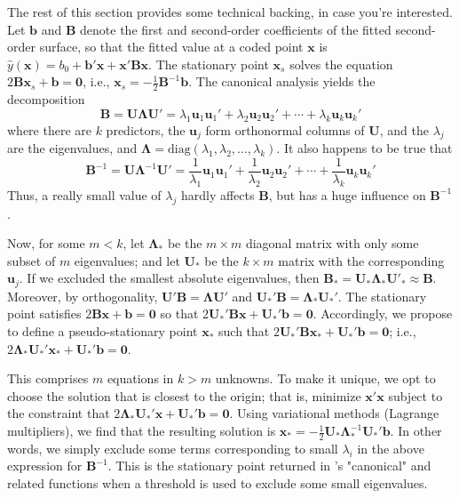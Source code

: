 \documentclass[article,nojss]{jss}
\def\rsm{\pkg{rsm}}
\def\bb{\mathbf{b}}
\def\bB{\mathbf{B}}
\def\bu{\mathbf{u}}
\def\bU{\mathbf{U}}
\def\bLambda{\pmb{\Lambda}}
\def\bgamma{\pmb{\gamma}}
\def\bx{\mathbf{x}}
\def\bzero{\mathbf{0}}
\def\yhat{\hat{y}}
\def\bmat#1{\begin{bmatrix}#1\end{bmatrix}}
\begin{document}
The rest of this section provides some technical backing, in case you're interested. Let $\bb$ and $\bB$ denote the first and second-order coefficients of the fitted second-order surface, so that the fitted value at a coded point $\bx$ is $\yhat(\bx) = b_0 + \bb'\bx + \bx'\bB\bx$. The stationary point $\bx_s$ solves the equation $2\bB\bx_s + \bb = \bzero$, i.e., $\bx_s = -\frac12\bB^{-1}\bb$. The canonical analysis yields the decomposition 
\[ \bB = \bU\bLambda\bU' = \lambda_1\bu_1\bu_1' + \lambda_2\bu_2\bu_2' + \cdots + \lambda_k\bu_k\bu_k' \]
where there are $k$ predictors, the $\bu_j$ form orthonormal columns of $\bU$, and the $\lambda_j$ are the eigenvalues, and $\bLambda = \mathrm{diag}(\lambda_1,\lambda_2,\ldots,\lambda_k)$. It also happens to be true that 
\[ \bB^{-1} = \bU\bLambda^{-1}\bU'
= \textstyle\frac1{\lambda_1}\bu_1\bu_1' + \frac1{\lambda_2}\bu_2\bu_2' + \cdots + \frac1{\lambda_k}\bu_k\bu_k'  \]
Thus, a really small value of $\lambda_j$ hardly affects $\bB$, but has a huge influence on $\bB^{-1}$.

Now, for some $m<k$, let $\bLambda_*$ be the $m\times m$ diagonal matrix with only some subset of $m$ eigenvalues; and let  $\bU_*$ be the $k \times m$ matrix with the corresponding $\bu_j$. If we excluded the smallest absolute eigenvalues, then $\bB_* = \bU_*\bLambda_*\bU'_* \approx \bB$. Moreover, by orthogonality, $\bU'\bB = \bLambda\bU'$ and $\bU_*'\bB = \bLambda_*\bU_*'$.
The stationary point satisfies $2\bB\bx + \bb = \bzero$ so that $2\bU_*'\bB\bx + \bU_*'\bb = \bzero$. Accordingly, we propose to define a pseudo-stationary point $\bx_*$ such that $2\bU_*'\bB\bx_* + \bU_*'\bb = \bzero$; i.e., $2\bLambda_*\bU_*'\bx_* + \bU_*'\bb = \bzero$. 

This comprises $m$ equations in $k>m$ unknowns. 
To make it unique, we opt to choose the solution that is closest to the origin;
that is, minimize $\bx'\bx$ subject to the constraint that $2\bLambda_*\bU_*'\bx + \bU_*'\bb = \bzero$.
Using variational methods (Lagrange multipliers), we find that the resulting solution is $\bx_*= -\frac12\bU_*\bLambda_*^{-1}\bU_*'\bb$. In other words, we simply exclude some terms corresponding to small $\lambda_i$ in the above expression for $\bB^{-1}$.
This is the stationary point returned in \rsm's "canonical" and related functions when a threshold is used to exclude some small eigenvalues.
\end{document}
